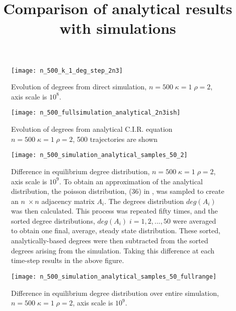 \documentclass[11pt]{article}
\begin{document}
\title{\vspace{-20mm}Comparison of analytical results with simulations}
\author{}
\date{}
\maketitle

\centering
\begin{figure}[h!]
  \vspace{-15mm}
  \texttt{[image: n\_500\_k\_1\_deg\_step\_2n3]}
  \caption{Evolution of degrees from direct simulation, $n=500 \; \kappa=1 \; \rho=2$, axis scale is $10^8$.}
\end{figure}


\centering
\begin{figure}[h!]
  \vspace{-5mm}
  \texttt{[image: n\_500\_fullsimulation\_analytical\_2n3ish]}
  \caption{Evolution of degrees from analytical C.I.R. equation $n=500 \; \kappa=1 \; \rho=2$, 500 trajectories are shown}
\end{figure}

\clearpage

\centering
\begin{figure}[h!]
  \texttt{[image: n\_500\_simulation\_analytical\_samples\_50\_2]}
  \caption{Difference in equilibrium degree distribution, $n=500 \; \kappa=1 \; \rho=2$, axis scale is $10^9$. To obtain an approximation of the analytical distribution, the poisson distribution, (36) in \cite{Rath2012}, was sampled to create an $n \; \times n$ adjacency matrix $A_i$. The degrees distribution $deg(A_i)$ was then calculated. This process was repeated fifty times, and the sorted degree distributions, $deg(A_i) \; i=1,2,...,50$ were averaged to obtain one final, average, steady state distribution. These sorted, analytically-based degrees were then subtracted from the sorted degrees arising from the simulation. Taking this difference at each time-step results in the above figure.}
\end{figure}

\centering
\begin{figure}[h!]
  \texttt{[image: n\_500\_simulation\_analytical\_samples\_50\_fullrange]}
  \caption{Difference in equilibrium degree distribution over entire simulation, $n=500 \; \kappa=1 \; \rho=2$, axis scale is $10^9$.}
\end{figure}
\vspace{20mm}


\end{document}
